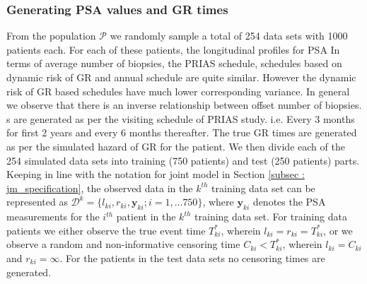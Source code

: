 \subsubsection{Generating PSA values and GR times}
From the population $\mathcal{P}$ we randomly sample a total of 254 data sets with 1000 patients each. For each of these patients, the longitudinal profiles for PSA In terms of average number of biopsies, the PRIAS schedule, schedules based on dynamic risk of GR and annual schedule are quite similar. However the dynamic risk of GR based schedules have much lower corresponding variance. In general we observe that there is an inverse relationship between offset number of biopsies.\\
s are generated as per the visiting schedule of PRIAS study. i.e. Every 3 months for first 2 years and every 6 months thereafter. The true GR times are generated as per the simulated hazard of GR for the patient. We then divide each of the 254 simulated data sets into training (750 patients) and test (250 patients) parts. Keeping in line with the notation for joint model in Section \ref{subsec : jm_specification}, the observed data in the $k^{th}$ training data set can be represented as $\mathcal{D}^k = \{l_{ki}, r_{ki}, \boldsymbol{y}_{ki}; i = 1,\ldots 750\}$, where $\boldsymbol{y}_{ki}$ denotes the PSA measurements for the $i^{th}$ patient in the $k^{th}$ training data set. For training data patients we either observe the true event time $T^*_{ki}$, wherein $l_{ki} = r_{ki} = T^*_{ki}$, or we observe a random and non-informative censoring time $C_{ki} < T^*_{ki}$, wherein $l_{ki} = C_{ki}$ and $r_{ki} = \infty$. For the patients in the test data sets no censoring times are generated.

